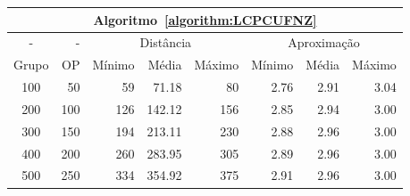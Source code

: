 \begin{table}[!htb]
  \vspace{5mm}

  \begin{tabular}{|c|r|r|r|r|r|r|r|}
    \hline
    \multicolumn{8}{|c|}{Algoritmo~\ref{algorithm:LCPCUFNZ}}                                                  \\ \hline
      -      &  -   & \multicolumn{3}{c|}{Distância}             & \multicolumn{3}{c|}{Aproximação}           \\ \hline
    Grupo    & OP   & Mínimo       & Média        & Máximo       & Mínimo       & Média        & Máximo       \\ \hline  
    100      & 50   & 59           &  71.18       & 80           & 2.76         & 2.91         & 3.04         \\ \hline
    200      & 100  & 126          & 142.12       & 156          & 2.85         & 2.94         & 3.00         \\ \hline
    300      & 150  & 194          & 213.11       & 230          & 2.88         & 2.96         & 3.00         \\ \hline
    400      & 200  & 260          & 283.95       & 305          & 2.89         & 2.96         & 3.00         \\ \hline
    500      & 250  & 334          & 354.92       & 375          & 2.91         & 2.96         & 3.00         \\ \hline    
  \end{tabular}

\end{table}
